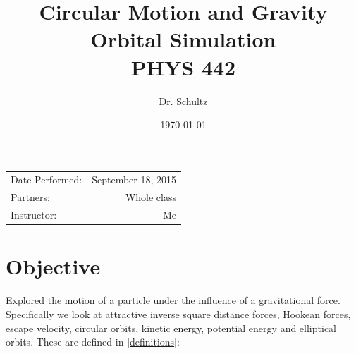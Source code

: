 \documentclass{article}
\title{Circular Motion and Gravity \\ Orbital Simulation \\ PHYS 442} %
\author{Dr. Schultz } %
\date{\today} %
\begin{document}
\maketitle %

\begin{center}
\begin{tabular}{l r}
Date Performed: & September 18, 2015 \\ %
Partners: & Whole class \\ %
Instructor: & Me %
\end{tabular}
\end{center}



\section{Objective}

Explored the motion of a particle under the influence of a gravitational force. Specifically we look at attractive inverse square distance forces, Hookean forces, escape velocity, circular orbits, kinetic energy, potential energy and elliptical orbits.  These are defined in \ref{definitions}:


\end{document}
